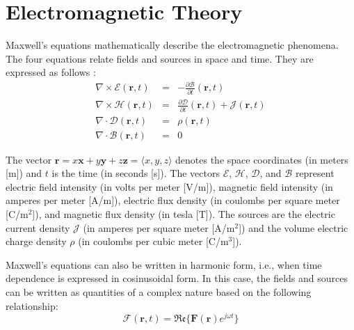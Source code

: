 	\section{Electromagnetic Theory}\label{chap:problemstatement:eletromagnetic}
	
		Maxwell's equations mathematically describe the electromagnetic phenomena. The four equations relate fields and sources in space and time. They are expressed as follows \citep{harrington2001}:
		\begin{eqnarray}
			\nabla\times\boldsymbol{\mathcal{E}}(\mathbf{r}, t) &=& - \frac{\partial\boldsymbol{ \mathcal{B}}}{\partial t}(\mathbf{r}, t) \label{eq:2:maxwell:time:1} \\
			\nabla\times\boldsymbol{\mathcal{H}}(\mathbf{r}, t) &=& \frac{\partial\boldsymbol{ \mathcal{D}}}{\partial t}(\mathbf{r}, t) + \boldsymbol{\mathcal{J}}(\mathbf{r}, t) \label{eq:2:maxwell:time:2} \\
			\nabla\cdot\boldsymbol{\mathcal{D}}(\mathbf{r}, t) &=& \rho(\mathbf{r}, t) \label{eq:2:maxwell:time:3} \\
			\nabla\cdot\boldsymbol{\mathcal{B}}(\mathbf{r}, t) &=& 0 \label{eq:2:maxwell:time:4}
		\end{eqnarray}
	
		The vector $\mathbf{r} = x\mathbf{x} + y\mathbf{y} + z\mathbf{z} = \langle x, y, z \rangle$ denotes the space coordinates (in meters [m])  and $t$ is the time (in seconds [s]). The vectors $\boldsymbol{\mathcal{E}}$, $\boldsymbol{\mathcal{H}}$, $\boldsymbol{\mathcal{D}}$, and $\boldsymbol{\mathcal{B}}$ represent electric field intensity (in volts per meter [V/m]), magnetic field intensity (in amperes per meter [A/m]), electric flux density (in coulombs per square meter [C/m$^2$]), and magnetic flux density (in tesla [T]). The sources are the electric current density $\boldsymbol{\mathcal{J}}$ (in amperes per square meter [A/m$^2$]) and the volume electric charge density $\rho$ (in coulombs per cubic meter [C/m$^3$]).
	
		Maxwell's equations can also be written in harmonic form, i.e., when time dependence is expressed in cosinusoidal form. In this case, the fields and sources can be written as quantities of a complex nature based on the following relationship:
		\begin{equation}
			\boldsymbol{\mathcal{F}}(\mathbf{r}, t) = \mathfrak{Re}\{\mathbf{F}(\mathbf{r})e^{j\omega t}\} \label{eq:2:fourier}
		\end{equation}
	
